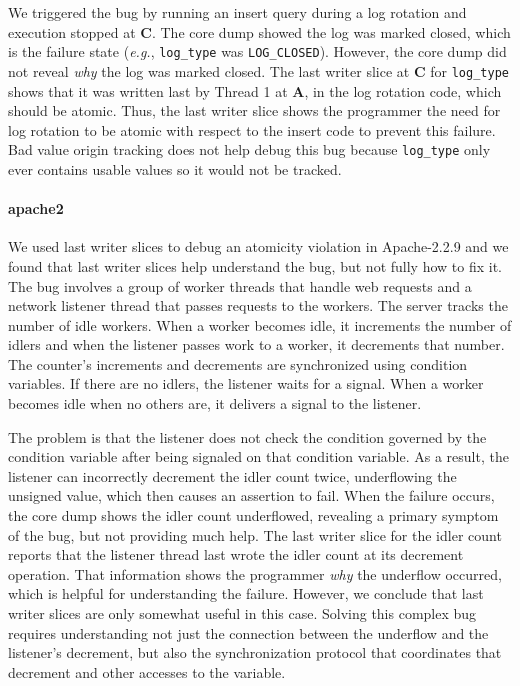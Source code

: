 \documentclass[preprint,10pt]{sigplanconf}
\begin{document}
We triggered the bug by running an insert query during a log rotation and
execution stopped at {\bf C}.  The core dump showed the log was marked closed,
which is the failure state ({\em e.g.}, {\tt log\_type} was {\tt LOG\_CLOSED}).
However, the core dump did not reveal {\em why} the log was marked closed.  The
last writer slice at {\bf C} for {\tt log\_type} shows that it was written last
by Thread 1 at {\bf A}, in the log rotation code, which should be atomic.
Thus, the last writer slice shows the programmer the need for log rotation to
be atomic with respect to the insert code to prevent this failure.  Bad value
origin tracking does not help debug this bug because {\tt log\_type} only ever
contains usable values so it would not be tracked.  

\paragraph{apache2}
We used last writer slices to debug an atomicity violation in Apache-2.2.9 and
we found that last writer slices help understand the bug, but not fully how to fix
it.  The bug involves a group of worker threads that handle web requests and a
network listener thread that passes requests to the workers.  The server tracks
the number of idle workers.  When a worker becomes idle, it increments the
number of idlers and when the listener passes work to a worker, it decrements
that number.  The counter's increments and decrements are synchronized using
condition variables.  If there are no idlers, the listener waits for a signal.
When a worker becomes idle when no others are, it delivers a signal to the
listener.

The problem is that the listener does not check the condition governed by the
condition variable after being signaled on that condition variable.  As a
result, the listener can incorrectly decrement the idler count twice,
underflowing the unsigned value, which then causes an assertion to fail.  When
the failure occurs, the core dump shows the idler count underflowed, revealing
a primary symptom of the bug, but not providing much help.  The last
writer slice for the idler count reports that the listener thread last
wrote the idler count at its decrement operation.  That information shows the programmer
{\em why} the underflow occurred, which is helpful for understanding the
failure.  However, we conclude that last writer slices are only somewhat 
useful in this case.  Solving this complex bug requires understanding not just
the connection between the underflow and the listener's decrement, but also the
synchronization protocol that coordinates that decrement and other accesses to
the variable.  
\end{document}
